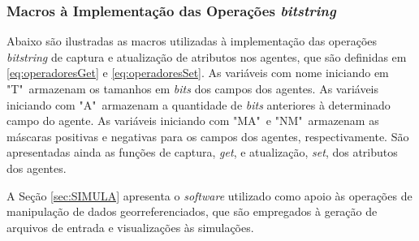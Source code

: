 \subsubsection{Macros à Implementação das Operações \textit{bitstring}}

Abaixo são ilustradas as macros utilizadas à implementação das operações \textit{bitstring} de captura e atualização de atributos nos agentes, que são definidas em \ref{eq:operadoresGet} e \ref{eq:operadoresSet}. As variáveis com nome iniciando em "T"\ armazenam os tamanhos em \textit{bits} dos campos dos agentes. As variáveis iniciando com "A"\ armazenam a quantidade de \textit{bits} anteriores à determinado campo do agente. As variáveis iniciando com "MA"\ e "NM"\ armazenam as máscaras positivas e negativas para os campos dos agentes, respectivamente. São apresentadas ainda as funções de captura, \textit{get}, e atualização, \textit{set}, dos atributos dos agentes. 



A Seção \ref{sec:SIMULA} apresenta o \textit{software} utilizado como apoio às operações de manipulação de dados georreferenciados, que são empregados à geração de arquivos de entrada e visualizações às simulações.

\newpage